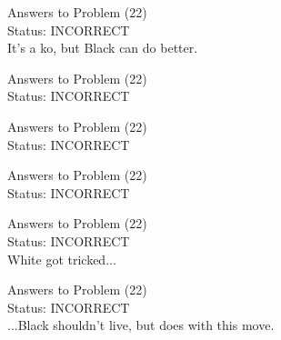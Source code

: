 \documentclass[11pt]{article}
\begin{document}
\begin{minipage}[t]{0.5\textwidth}
  {\centering
  
  Answers to Problem (22)\\
  Status: INCORRECT\\
  It's a ko, but Black can do better.\\
  }
\end{minipage}
\begin{minipage}[t]{0.5\textwidth}
  {\centering
  
  Answers to Problem (22)\\
  Status: INCORRECT\\
  
  }
\end{minipage}
\begin{minipage}[t]{0.5\textwidth}
  {\centering
  
  Answers to Problem (22)\\
  Status: INCORRECT\\
  
  }
\end{minipage}
\begin{minipage}[t]{0.5\textwidth}
  {\centering
  
  Answers to Problem (22)\\
  Status: INCORRECT\\
  
  }
\end{minipage}
\begin{minipage}[t]{0.5\textwidth}
  {\centering
  
  Answers to Problem (22)\\
  Status: INCORRECT\\
  White got tricked...\\
  }
\end{minipage}
\begin{minipage}[t]{0.5\textwidth}
  {\centering
  
  Answers to Problem (22)\\
  Status: INCORRECT\\
  ...Black shouldn't live, but does with this move.\\
  }
\end{minipage}
\end{document}
